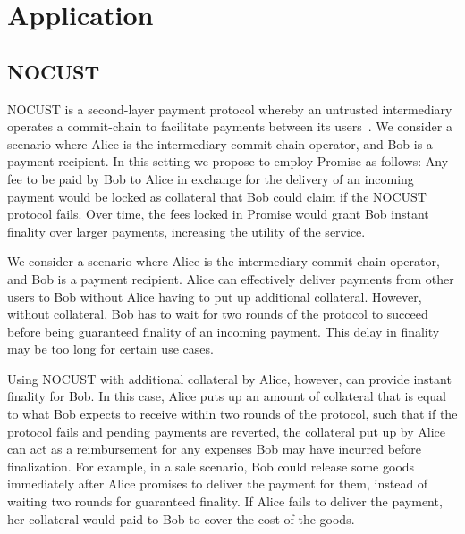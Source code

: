 \documentclass[runningheads]{llncs}
\newcommand{\sys}{Promise\xspace}
\begin{document}


\section{Application}
\label{sec:application}

\subsection{NOCUST}

NOCUST is a second-layer payment protocol whereby an untrusted intermediary operates a commit-chain to facilitate payments between its users~\cite{Khalil2019NOCUST}. We consider a scenario where Alice is the intermediary commit-chain operator, and Bob is a payment recipient. In this setting we propose to employ \sys as follows: Any fee to be paid by Bob to Alice in exchange for the delivery of an incoming payment would be locked as collateral that Bob could claim if the NOCUST protocol fails. Over time, the fees locked in \sys would grant Bob instant finality over larger payments, increasing the utility of the service.


We consider a scenario where Alice is the intermediary commit-chain operator, and Bob is a payment recipient. Alice can effectively deliver payments from other users to Bob without Alice having to put up additional collateral. However, without collateral, Bob has to wait for two rounds of the protocol to succeed before being guaranteed finality of an incoming payment. This delay in finality may be too long for certain use cases. 

Using NOCUST with additional collateral by Alice, however, can provide instant finality for Bob. In this case, Alice puts up an amount of collateral that is equal to what Bob expects to receive within two rounds of the protocol, such that if the protocol fails and pending payments are reverted, the collateral put up by Alice can act as a reimbursement for any expenses Bob may have incurred before finalization. For example, in a sale scenario, Bob could release some goods immediately after Alice promises to deliver the payment for them, instead of waiting two rounds for guaranteed finality. If Alice fails to deliver the payment, her collateral would paid to Bob to cover the cost of the goods.
\end{document}
